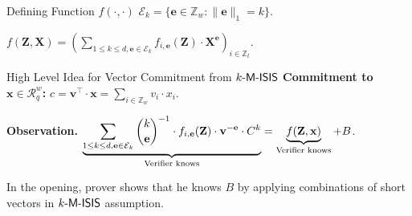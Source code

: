 \begin{frame}{Defining Function $f(\cdot, \cdot)$}
	$\mathcal{E}_k = \{\mathbf{e} \in \mathbb{Z}_w : \lVert\mathbf{e}\rVert_1 = k\}$.\pause
	
	$\displaystyle f(\mathbf{Z}, \mathbf{X}) = \left(\sum_{1 \leq k \leq d, \mathbf{e} \in \mathcal{E}_k} f_{i,\mathbf{e}}(\mathbf{Z}) \cdot\mathbf{X}^\mathbf{e}\right)_{i \in \mathbb{Z}_t}$.
\end{frame}
\begin{frame}{High Level Idea for Vector Commitment from $k\textsf{-M-ISIS}$}
	\textbf{Commitment to $\mathbf{x} \in \mathcal{R}_q^{w}$:} $c = \mathbf{v}^\top \cdot \mathbf{x} = \sum_{i \in \mathbb{Z}_w}v_i\cdot x_i$.\pause
	
	\textbf{Observation.} $\underbrace{\sum_{1\leq k\leq d, \mathbf{e} \in \mathcal{E}_k}\binom{k}{\mathbf{e}}^{-1}\cdot f_{i,\mathbf{e}}(\mathbf{Z})\cdot \mathbf{v}^{-\mathbf{e}}\cdot C^k}_{\text{\text{Verifier knows}}} = \underbrace{f(\mathbf{Z}, \mathbf{x})}_{\text{\text{Verifier knows}}} + B$. \pause
	
	In the opening, prover shows that he knows $B$ by applying combinations of short vectors in $k\textsf{-M-ISIS}$ assumption.
\end{frame}